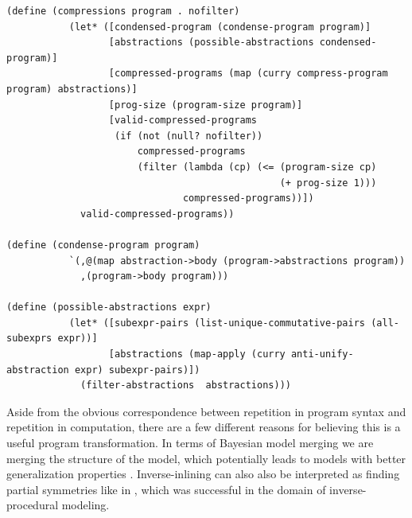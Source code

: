 \documentclass[a4paper,10pt]{article}
\begin{document}
\begin{lstlisting}[frame=trBL]
(define (compressions program . nofilter)
           (let* ([condensed-program (condense-program program)]
                  [abstractions (possible-abstractions condensed-program)]
                  [compressed-programs (map (curry compress-program program) abstractions)]
                  [prog-size (program-size program)]
                  [valid-compressed-programs
                   (if (not (null? nofilter))
                       compressed-programs
                       (filter (lambda (cp) (<= (program-size cp)
                                                (+ prog-size 1)))
                               compressed-programs))])
             valid-compressed-programs))

(define (condense-program program)
           `(,@(map abstraction->body (program->abstractions program))
             ,(program->body program)))

(define (possible-abstractions expr)
           (let* ([subexpr-pairs (list-unique-commutative-pairs (all-subexprs expr))]
                  [abstractions (map-apply (curry anti-unify-abstraction expr) subexpr-pairs)])
             (filter-abstractions  abstractions)))
\end{lstlisting}

Aside from the obvious correspondence between repetition in program syntax and repetition in computation, there are a few different reasons for believing this is a useful program transformation.  In terms of Bayesian model merging we are merging the structure of the model, which potentially leads to models with better generalization properties \cite{Stolcke:1994:IPG:645515.658235}.  Inverse-inlining can also also be interpreted as finding partial symmetries like in \cite{DBLP:journals/tog/BokelohWS10}, which was successful in the domain of inverse-procedural modeling.
\end{document}
